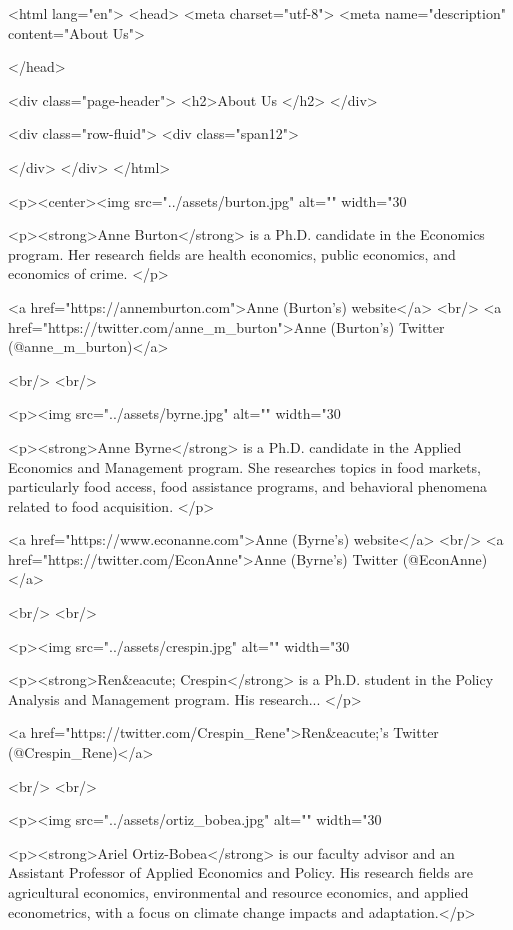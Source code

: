 <html lang="en">
  <head>
    <meta charset="utf-8">
    <meta name="description" content="About Us">
  
  </head>

        

<div class="page-header">
  <h2>About Us </h2>
</div>

<div class="row-fluid">
  <div class="span12">
  
  </div>
</div>
</html>
        
 <p><center><img src="../assets/burton.jpg" alt="" width="30%

<p><strong>Anne Burton</strong> is a Ph.D. candidate in the Economics program. Her research fields are health economics, public economics, and economics of crime. </p>

<a href="https://annemburton.com">Anne (Burton's) website</a>
<br/>
<a href="https://twitter.com/anne_m_burton">Anne (Burton's) Twitter (@anne_m_burton)</a>

    <br/>
    <br/>
    
<p><img src="../assets/byrne.jpg" alt="" width="30%

 <p><strong>Anne Byrne</strong> is a Ph.D. candidate in the Applied Economics and Management program. She researches topics in food markets, particularly food access, food assistance programs, and behavioral phenomena related to food acquisition. </p>

    <a href="https://www.econanne.com">Anne (Byrne's) website</a>
    <br/>
    <a href="https://twitter.com/EconAnne">Anne (Byrne's) Twitter (@EconAnne)</a>
    
    <br/>
    <br/>

<p><img src="../assets/crespin.jpg" alt="" width="30%

<p><strong>Ren&eacute; Crespin</strong> is a Ph.D. student in the Policy Analysis and Management program. His research... </p>

<a href="https://twitter.com/Crespin_Rene">Ren&eacute;'s Twitter (@Crespin_Rene)</a>

<br/>
<br/>

<p><img src="../assets/ortiz_bobea.jpg" alt="" width="30%

<p><strong>Ariel Ortiz-Bobea</strong> is our faculty advisor and an Assistant Professor of Applied Economics and Policy. His research fields are agricultural economics, environmental and resource economics, and applied econometrics, with a focus on climate change impacts and adaptation.</p>

